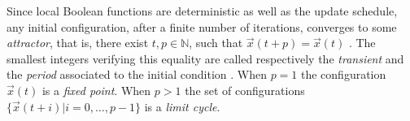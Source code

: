 \documentclass[preprint,12pt]{elsarticle}
\begin{document}

Since local Boolean functions are deterministic as well as the update schedule, %
any initial configuration, %
after a finite number of iterations, %
converges to some \textit{attractor}, that is, there exist $t,p \in \mathbb{N}$, such that $\vec{x}(t+p)=\vec{x}(t)$%
. The smallest integers verifying this equality are called respectively the \textit{transient} and the \textit{period} associated to the initial condition%
. When $p=1$ the configuration $\vec{x}(t)$ is %
a \textit{fixed point}. %
When $p>1$ the set of configurations $\{\vec{x}(t+i)|i=0,\ldots,p-1 \}$ is %
a \textit{limit cycle}. %

\end{document}
